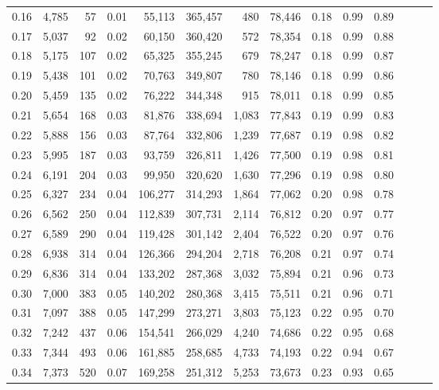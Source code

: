 \begin{tabular}{rrrrrrrrrrrrrr}
0.16 &  4,785 &     57 &  0.01 &   55,113 &  365,457 &     480 &  78,446 &  0.18 &  0.99 &      0.89 \\
0.17 &  5,037 &     92 &  0.02 &   60,150 &  360,420 &     572 &  78,354 &  0.18 &  0.99 &      0.88 \\
0.18 &  5,175 &    107 &  0.02 &   65,325 &  355,245 &     679 &  78,247 &  0.18 &  0.99 &      0.87 \\
0.19 &  5,438 &    101 &  0.02 &   70,763 &  349,807 &     780 &  78,146 &  0.18 &  0.99 &      0.86 \\
0.20 &  5,459 &    135 &  0.02 &   76,222 &  344,348 &     915 &  78,011 &  0.18 &  0.99 &      0.85 \\
0.21 &  5,654 &    168 &  0.03 &   81,876 &  338,694 &   1,083 &  77,843 &  0.19 &  0.99 &      0.83 \\
0.22 &  5,888 &    156 &  0.03 &   87,764 &  332,806 &   1,239 &  77,687 &  0.19 &  0.98 &      0.82 \\
0.23 &  5,995 &    187 &  0.03 &   93,759 &  326,811 &   1,426 &  77,500 &  0.19 &  0.98 &      0.81 \\
0.24 &  6,191 &    204 &  0.03 &   99,950 &  320,620 &   1,630 &  77,296 &  0.19 &  0.98 &      0.80 \\
0.25 &  6,327 &    234 &  0.04 &  106,277 &  314,293 &   1,864 &  77,062 &  0.20 &  0.98 &      0.78 \\
0.26 &  6,562 &    250 &  0.04 &  112,839 &  307,731 &   2,114 &  76,812 &  0.20 &  0.97 &      0.77 \\
0.27 &  6,589 &    290 &  0.04 &  119,428 &  301,142 &   2,404 &  76,522 &  0.20 &  0.97 &      0.76 \\
0.28 &  6,938 &    314 &  0.04 &  126,366 &  294,204 &   2,718 &  76,208 &  0.21 &  0.97 &      0.74 \\
0.29 &  6,836 &    314 &  0.04 &  133,202 &  287,368 &   3,032 &  75,894 &  0.21 &  0.96 &      0.73 \\
0.30 &  7,000 &    383 &  0.05 &  140,202 &  280,368 &   3,415 &  75,511 &  0.21 &  0.96 &      0.71 \\
0.31 &  7,097 &    388 &  0.05 &  147,299 &  273,271 &   3,803 &  75,123 &  0.22 &  0.95 &      0.70 \\
0.32 &  7,242 &    437 &  0.06 &  154,541 &  266,029 &   4,240 &  74,686 &  0.22 &  0.95 &      0.68 \\
0.33 &  7,344 &    493 &  0.06 &  161,885 &  258,685 &   4,733 &  74,193 &  0.22 &  0.94 &      0.67 \\
0.34 &  7,373 &    520 &  0.07 &  169,258 &  251,312 &   5,253 &  73,673 &  0.23 &  0.93 &      0.65 \\

\end{tabular}
